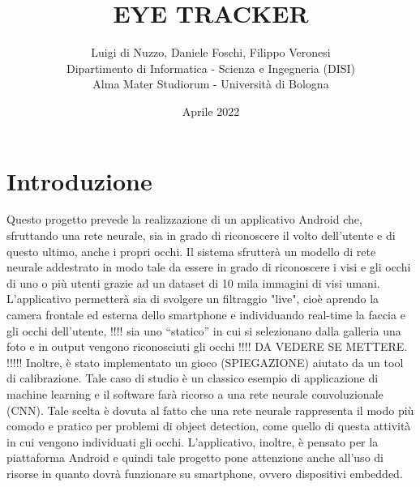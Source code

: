\documentclass[11pt]{article}
\title{EYE TRACKER}
\author{Luigi di Nuzzo,
Daniele Foschi,
Filippo Veronesi\\
\AND
\AND
\AND
\AND
\AND
	Dipartimento di Informatica - Scienza e Ingegneria (DISI)\\
\AND
Alma Mater Studiorum - Università di Bologna\\
}
\date{Aprile 2022}
\begin{document}
\maketitle



\newpage

\clearpage

\null

\clearpage

\newpage

\tableofcontents


\newpage






\newpage
\fancyfoot[L]{\thepage}
\setcounter{page}{1}
\section{Introduzione}
Questo progetto prevede la realizzazione di un applicativo Android che, sfruttando una rete neurale,
sia in grado di riconoscere il volto dell’utente e di questo ultimo, anche i propri occhi. Il sistema sfrutterà un modello di rete neurale
addestrato in modo tale da essere in grado di riconoscere i visi e gli occhi di uno o più utenti grazie ad un dataset di 10 mila immagini di visi umani.
L’applicativo permetterà sia di svolgere un filtraggio "live", cioè aprendo la camera frontale ed esterna dello smartphone
e individuando real-time la faccia e gli occhi dell’utente, !!!! sia uno “statico” in cui si selezionano dalla galleria
una foto e in output vengono riconosciuti gli occhi !!!! DA VEDERE SE METTERE. !!!!!
\newline
Inoltre, è stato implementato un gioco (SPIEGAZIONE) aiutato da un tool di calibrazione.
\newline \newline
Tale caso di studio è un classico esempio di applicazione di machine learning e il software farà ricorso
a una rete neurale convoluzionale (CNN). Tale scelta è dovuta al fatto che una rete neurale
rappresenta il modo più comodo e pratico per problemi di object detection, come quello di questa
attività in cui vengono individuati gli occhi.
\newline \newline
L’applicativo, inoltre, è pensato per la piattaforma Android e quindi tale progetto pone attenzione
anche all’uso di risorse in quanto dovrà funzionare su smartphone, ovvero dispositivi embedded.

\newpage
\end{document}
